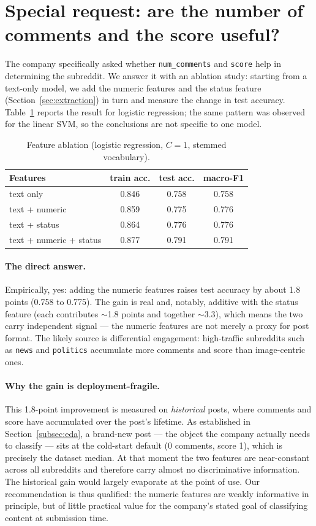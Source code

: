 \documentclass[11pt,a4paper]{article}
\begin{document}
\section{Special request: are the number of comments and the score useful?}
\label{sec:ablation}
The company specifically asked whether \texttt{num\_comments} and
\texttt{score} help in determining the subreddit. We answer it with an
ablation study: starting from a text-only model, we add the numeric features
and the status feature (Section~\ref{sec:extraction}) in turn and measure the
change in test accuracy. Table~\ref{tab:ablation} reports the result for
logistic regression; the same pattern was observed for the linear SVM, so the
conclusions are not specific to one model.
 
\begin{table}[htbp]\centering\small
\caption{Feature ablation (logistic regression, $C=1$, stemmed vocabulary).}
\label{tab:ablation}
\begin{tabular}{lccc}\toprule
Features & train acc. & test acc. & macro-F1\\\midrule
text only               & 0.846 & 0.758 & 0.758\\
text + numeric          & 0.859 & 0.775 & 0.776\\
text + status           & 0.864 & 0.776 & 0.776\\
text + numeric + status & 0.877 & 0.791 & 0.791\\\bottomrule
\end{tabular}
\end{table}
 
\paragraph{The direct answer.}
Empirically, yes: adding the numeric features raises test accuracy by about
1.8 points (0.758 to 0.775). The gain is real and, notably, additive with the
status feature (each contributes $\sim$1.8 points and together
$\sim$3.3), which means the two carry independent signal --- the
numeric features are not merely a proxy for post format. The likely source is
differential engagement: high-traffic subreddits such as \texttt{news} and
\texttt{politics} accumulate more comments and score than image-centric ones.
 
\paragraph{Why the gain is deployment-fragile.}
This 1.8-point improvement is measured on \emph{historical} posts, where
comments and score have accumulated over the post's lifetime. As established
in Section~\ref{subsec:eda}, a brand-new post --- the object the company
actually needs to classify --- sits at the cold-start default (0 comments,
score 1), which is precisely the dataset median. At that moment the two
features are near-constant across all subreddits and therefore carry almost no
discriminative information. The historical gain would largely evaporate at the
point of use. Our recommendation is thus qualified: the numeric features are
weakly informative in principle, but of little practical value for the
company's stated goal of classifying content at submission time.
 
\end{document}
